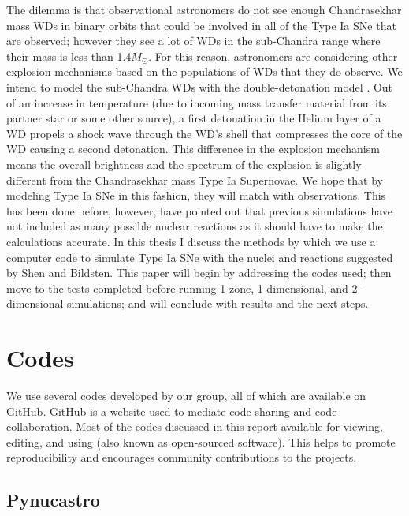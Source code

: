 \documentclass[preprint]{aastex62}
\begin{document}
  The dilemma is that observational astronomers do not see enough Chandrasekhar mass WDs in binary orbits that could be involved in all of the Type Ia SNe that are observed; however they see a lot of WDs in the sub-Chandra range where their mass is less than 1.4$M_{\odot}$. For this reason, astronomers are considering other explosion mechanisms based on the populations of WDs that they do observe. We intend to model the sub-Chandra WDs with the double-detonation model \citep{doubledet1, doubledet2}. Out of an increase in temperature (due to incoming mass transfer material from its partner star or some other source), a first detonation in the Helium layer of a WD propels a shock wave through the WD's shell that compresses the core of the WD causing a second detonation. This difference in the explosion mechanism means the overall brightness and the spectrum of the explosion is slightly different from the Chandrasekhar mass Type Ia Supernovae. We hope that by modeling Type Ia SNe in this fashion, they will match with observations. This has been done before, however, \citet{shenNbildsten} have pointed out that previous simulations have not included as many possible nuclear reactions as it should have to make the calculations accurate. In this thesis I discuss the methods by which we use a computer code to simulate Type Ia SNe with the nuclei and reactions suggested by Shen and Bildsten. This paper will begin by addressing the codes used; then move to the tests completed before running 1-zone, 1-dimensional, and 2-dimensional simulations; and will conclude with results and the next steps. 

\section{Codes}
  	
    We use several codes developed by our group, all of which are available on GitHub. GitHub is a website used to mediate code sharing and code collaboration. Most of the codes discussed in this report available for viewing, editing, and using (also known as open-sourced software). This helps to promote reproducibility and encourages community contributions to the projects. 

  \subsection{Pynucastro}
    
\end{document}

